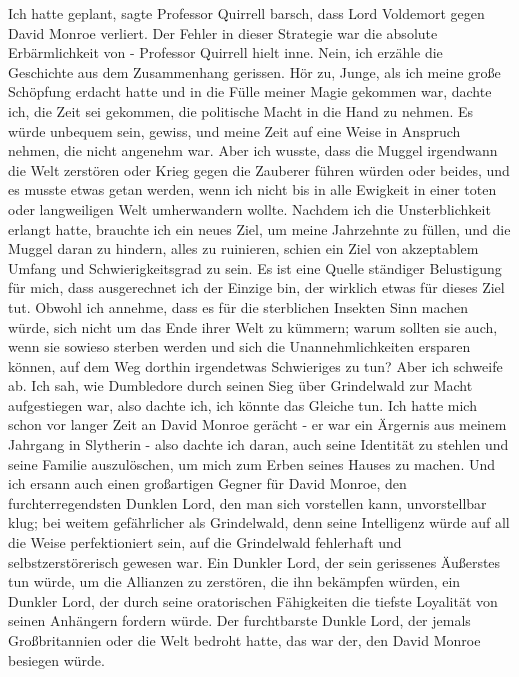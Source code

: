\glqq{}Ich hatte geplant\grqq{}, sagte Professor Quirrell barsch, \glqq{}dass Lord
Voldemort gegen David Monroe verliert. Der Fehler in dieser Strategie war die
absolute Erbärmlichkeit von -\grqq{} Professor Quirrell hielt inne. \glqq{}Nein, ich
erzähle die Geschichte aus dem Zusammenhang gerissen. Hör zu, Junge, als ich
meine große Schöpfung erdacht hatte und in die Fülle meiner Magie gekommen war,
dachte ich, die Zeit sei gekommen, die politische Macht in die Hand zu nehmen.
Es würde unbequem sein, gewiss, und meine Zeit auf eine Weise in Anspruch
nehmen, die nicht angenehm war. Aber ich wusste, dass die Muggel irgendwann die
Welt zerstören oder Krieg gegen die Zauberer führen würden oder beides, und es
musste etwas getan werden, wenn ich nicht bis in alle Ewigkeit in einer toten
oder langweiligen Welt umherwandern wollte. Nachdem ich die Unsterblichkeit
erlangt hatte, brauchte ich ein neues Ziel, um meine Jahrzehnte zu füllen, und
die Muggel daran zu hindern, alles zu ruinieren, schien ein Ziel von akzeptablem
Umfang und Schwierigkeitsgrad zu sein. Es ist eine Quelle ständiger Belustigung
für mich, dass ausgerechnet ich der Einzige bin, der wirklich etwas für dieses
Ziel tut. Obwohl ich annehme, dass es für die sterblichen Insekten Sinn machen
würde, sich nicht um das Ende ihrer Welt zu kümmern; warum sollten sie auch,
wenn sie sowieso sterben werden und sich die Unannehmlichkeiten ersparen können,
auf dem Weg dorthin irgendetwas Schwieriges zu tun? Aber ich schweife ab. Ich
sah, wie Dumbledore durch seinen Sieg über Grindelwald zur Macht aufgestiegen
war, also dachte ich, ich könnte das Gleiche tun. Ich hatte mich schon vor
langer Zeit an David Monroe gerächt - er war ein Ärgernis aus meinem Jahrgang in
Slytherin - also dachte ich daran, auch seine Identität zu stehlen und seine
Familie auszulöschen, um mich zum Erben seines Hauses zu machen. Und ich ersann
auch einen großartigen Gegner für David Monroe, den furchterregendsten Dunklen
Lord, den man sich vorstellen kann, unvorstellbar klug; bei weitem gefährlicher
als Grindelwald, denn seine Intelligenz würde auf all die Weise perfektioniert
sein, auf die Grindelwald fehlerhaft und selbstzerstörerisch gewesen war. Ein
Dunkler Lord, der sein gerissenes Äußerstes tun würde, um die Allianzen zu
zerstören, die ihn bekämpfen würden, ein Dunkler Lord, der durch seine
oratorischen Fähigkeiten die tiefste Loyalität von seinen Anhängern fordern
würde. Der furchtbarste Dunkle Lord, der jemals Großbritannien oder die Welt
bedroht hatte, das war der, den David Monroe besiegen würde.\grqq{}


